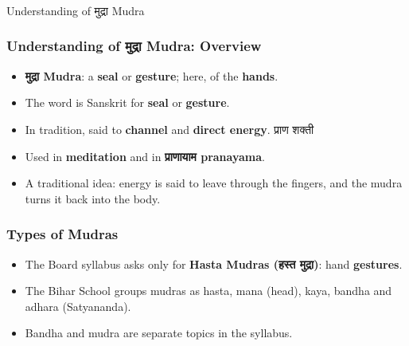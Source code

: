 \begin{frame}[fragile]\frametitle{}
\begin{center}
{\Large Understanding of मुद्रा  Mudra}
\end{center}
\end{frame}

\begin{frame}[fragile]\frametitle{Understanding of मुद्रा  Mudra: Overview}

      \begin{itemize}
        \item \textbf{मुद्रा  Mudra}: a \textbf{seal} or \textbf{gesture}; here, of the \textbf{hands}.
        \item The word is Sanskrit for \textbf{seal} or \textbf{gesture}.
        \item In tradition, said to \textbf{channel} and \textbf{direct energy}.  प्राण शक्ती
        \item Used in \textbf{meditation} and in \textbf{प्राणायाम  pranayama}.
		\item A traditional idea: energy is said to leave through the fingers, and the mudra turns it back into the body.
      \end{itemize}
\end{frame}

\begin{frame}[fragile]\frametitle{Types of Mudras}

      \begin{itemize}
        \item The Board syllabus asks only for \textbf{Hasta Mudras (हस्त मुद्रा)}: hand \textbf{gestures}.
        \item The Bihar School groups mudras as hasta, mana (head), kaya, bandha and adhara (Satyananda).
        \item Bandha and mudra are separate topics in the syllabus.
      \end{itemize}

\end{frame}


